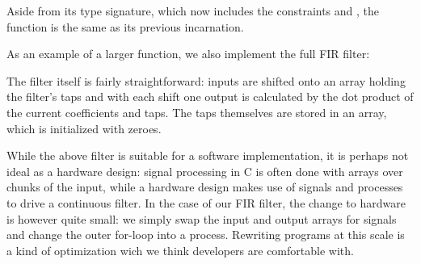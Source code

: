 \documentclass[../main.tex]{subfiles}
\begin{document}
\noindent Aside from its type signature, which now includes the constraints  and , the function is the same as its previous incarnation.

As an example of a larger function, we also implement the full FIR filter:


\noindent The filter itself is fairly straightforward: inputs are shifted onto an array holding the filter's taps and with each shift one output is calculated by the dot product of the current coefficients and taps. The taps themselves are stored in an array, which is initialized with zeroes.

While the above filter is suitable for a software implementation, it is perhaps not ideal as a hardware design: signal processing in C is often done with arrays over chunks of the input, while a hardware design makes use of signals and processes to drive a continuous filter. In the case of our FIR filter, the change to hardware is however quite small: we simply swap the input and output arrays for signals and change the outer for-loop into a process. Rewriting programs at this scale is a kind of optimization wich we think developers are comfortable with. 




\end{document}
